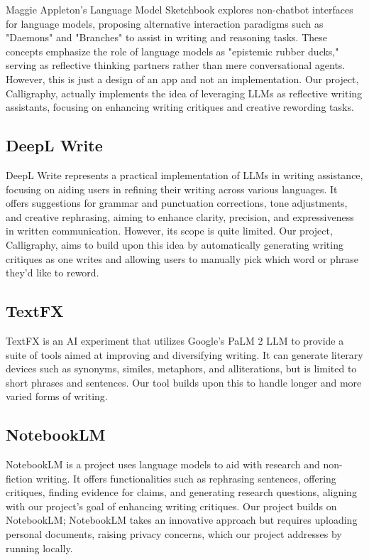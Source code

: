 \documentclass{article}
\begin{document}
Maggie Appleton's Language Model Sketchbook explores non-chatbot interfaces for
language models, proposing alternative interaction paradigms such as "Daemons" and
"Branches" to assist in writing and reasoning tasks. These concepts emphasize the
role of language models as "epistemic rubber ducks," serving as reflective thinking
partners rather than mere conversational agents. However, this is just a design of
an app and not an implementation. Our project, Calligraphy, actually implements
the idea of leveraging LLMs as reflective writing assistants, focusing on enhancing
writing critiques and creative rewording tasks.

\subsection{DeepL Write}

DeepL Write represents a practical implementation of LLMs in writing assistance,
focusing on aiding users in refining their writing across various languages. It
offers suggestions for grammar and punctuation corrections, tone adjustments, and
creative rephrasing, aiming to enhance clarity, precision, and expressiveness in
written communication. However, its scope is quite limited. Our project,
Calligraphy, aims to build upon this idea by automatically generating writing
critiques as one writes and allowing users to manually pick which word or phrase
they'd like to reword.

\subsection{TextFX}

TextFX is an AI experiment that utilizes Google's PaLM 2 LLM to provide a suite of
tools aimed at improving and diversifying writing. It can generate literary
devices such as synonyms, similes, metaphors, and alliterations, but is limited to
short phrases and sentences. Our tool builds upon this to handle longer and more
varied forms of writing.

\subsection{NotebookLM}

NotebookLM is a project uses language models to aid with research and non-fiction
writing. It offers functionalities such as rephrasing sentences, offering critiques,
finding evidence for claims, and generating research questions, aligning with our
project's goal of enhancing writing critiques. Our project builds on NotebookLM;
NotebookLM takes an innovative approach but requires uploading personal documents,
raising privacy concerns, which our project addresses by running locally.
\end{document}
